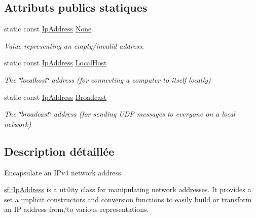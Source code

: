 \subsection*{Attributs publics statiques}
\begin{DoxyCompactItemize}
\item 
\mbox{\label{classsf_1_1IpAddress_a4619b4abbe3c8fef056e7299db967404}} 
static const \hyperlink{classsf_1_1IpAddress}{Ip\+Address} \hyperlink{classsf_1_1IpAddress_a4619b4abbe3c8fef056e7299db967404}{None}
\begin{DoxyCompactList}\small\item\em Value representing an empty/invalid address. \end{DoxyCompactList}\item 
\mbox{\label{classsf_1_1IpAddress_a594d3a8e2559f8fa8ab0a96fa597333b}} 
static const \hyperlink{classsf_1_1IpAddress}{Ip\+Address} \hyperlink{classsf_1_1IpAddress_a594d3a8e2559f8fa8ab0a96fa597333b}{Local\+Host}
\begin{DoxyCompactList}\small\item\em The \char`\"{}localhost\char`\"{} address (for connecting a computer to itself locally) \end{DoxyCompactList}\item 
\mbox{\label{classsf_1_1IpAddress_aa93d1d57b65d243f2baf804b6035465c}} 
static const \hyperlink{classsf_1_1IpAddress}{Ip\+Address} \hyperlink{classsf_1_1IpAddress_aa93d1d57b65d243f2baf804b6035465c}{Broadcast}
\begin{DoxyCompactList}\small\item\em The \char`\"{}broadcast\char`\"{} address (for sending U\+DP messages to everyone on a local network) \end{DoxyCompactList}\end{DoxyCompactItemize}


\subsection{Description détaillée}
Encapsulate an I\+Pv4 network address. 

\hyperlink{classsf_1_1IpAddress}{sf\+::\+Ip\+Address} is a utility class for manipulating network addresses. It provides a set a implicit constructors and conversion functions to easily build or transform an IP address from/to various representations.

